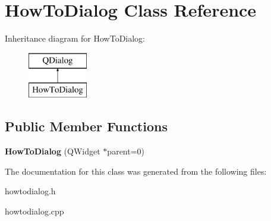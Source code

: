\hypertarget{class_how_to_dialog}{\section{How\+To\+Dialog Class Reference}
\label{class_how_to_dialog}
}
Inheritance diagram for How\+To\+Dialog\+:\begin{figure}[H]
\begin{center}
\leavevmode
\includegraphics[height=2.000000cm]{class_how_to_dialog}
\end{center}
\end{figure}
\subsection*{Public Member Functions}
\begin{DoxyCompactItemize}
\item 
\hypertarget{class_how_to_dialog_ae1cee44a39ca4f51994de2e4067e6121}{{\bfseries How\+To\+Dialog} (Q\+Widget $\ast$parent=0)}\label{class_how_to_dialog_ae1cee44a39ca4f51994de2e4067e6121}

\end{DoxyCompactItemize}


The documentation for this class was generated from the following files\+:\begin{DoxyCompactItemize}
\item 
howtodialog.\+h\item 
howtodialog.\+cpp\end{DoxyCompactItemize}

